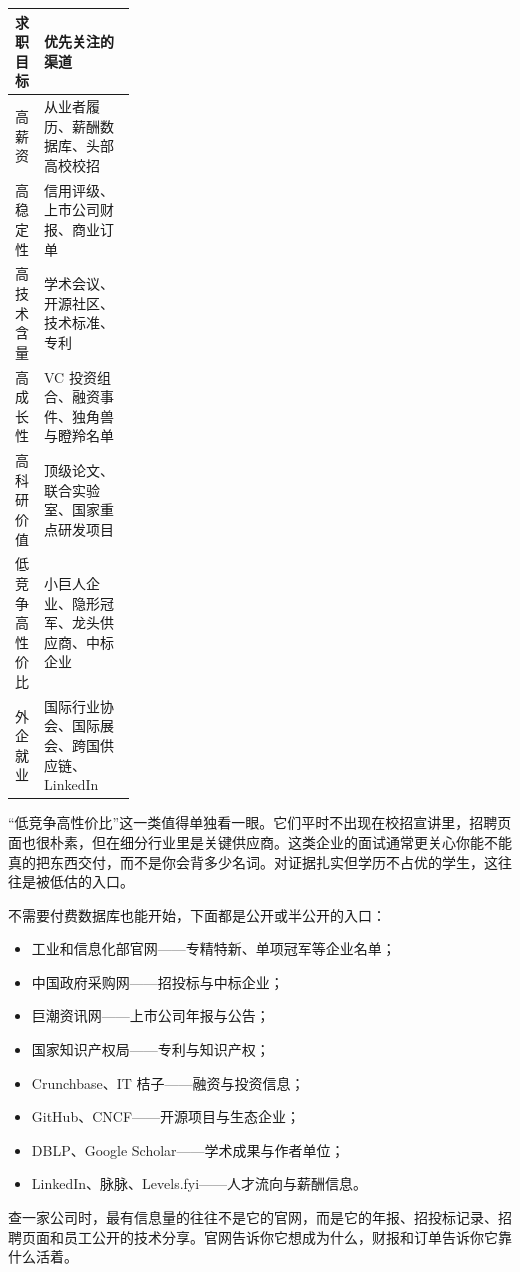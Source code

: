 \documentclass[UTF8,zihao=5,openany]{ctexbook}
\begin{document}
\begin{center}\small
\begin{tabularx}{\linewidth}{p{0.24\linewidth}Y}
\toprule
求职目标 & 优先关注的渠道 \\
\midrule
高薪资 & 从业者履历、薪酬数据库、头部高校校招 \\
高稳定性 & 信用评级、上市公司财报、商业订单 \\
高技术含量 & 学术会议、开源社区、技术标准、专利 \\
高成长性 & VC 投资组合、融资事件、独角兽与瞪羚名单 \\
高科研价值 & 顶级论文、联合实验室、国家重点研发项目 \\
低竞争高性价比 & 小巨人企业、隐形冠军、龙头供应商、中标企业 \\
外企就业 & 国际行业协会、国际展会、跨国供应链、LinkedIn \\
\bottomrule
\end{tabularx}
\end{center}

“低竞争高性价比”这一类值得单独看一眼。它们平时不出现在校招宣讲里，招聘页面也很朴素，但在细分行业里是关键供应商。这类企业的面试通常更关心你能不能真的把东西交付，而不是你会背多少名词。对证据扎实但学历不占优的学生，这往往是被低估的入口。

不需要付费数据库也能开始，下面都是公开或半公开的入口：
\begin{itemize}
\item 工业和信息化部官网——专精特新、单项冠军等企业名单；
\item 中国政府采购网——招投标与中标企业；
\item 巨潮资讯网——上市公司年报与公告；
\item 国家知识产权局——专利与知识产权；
\item Crunchbase、IT 桔子——融资与投资信息；
\item GitHub、CNCF——开源项目与生态企业；
\item DBLP、Google Scholar——学术成果与作者单位；
\item LinkedIn、脉脉、Levels.fyi——人才流向与薪酬信息。
\end{itemize}

查一家公司时，最有信息量的往往不是它的官网，而是它的年报、招投标记录、招聘页面和员工公开的技术分享。官网告诉你它想成为什么，财报和订单告诉你它靠什么活着。
\end{document}
